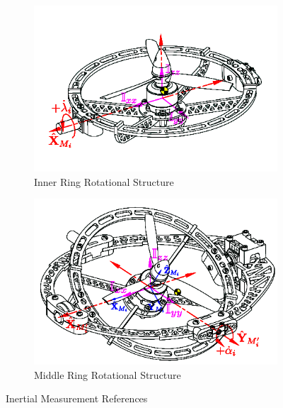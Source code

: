 \begin{figure}[htbp]
\centering
\begin{subfigure}{0.49\textwidth}
\includegraphics[width=\textwidth]{figs/inertia-inner}
\caption{Inner Ring Rotational Structure}
\label{fig:inertia-inner}
\end{subfigure}
\begin{subfigure}{0.49\textwidth}
\includegraphics[width=\textwidth]{figs/inertia-middle}
\caption{Middle Ring Rotational Structure}
\label{fig:inertia-middle}
\end{subfigure}
\caption{Inertial Measurement References}
\end{figure}
\par
